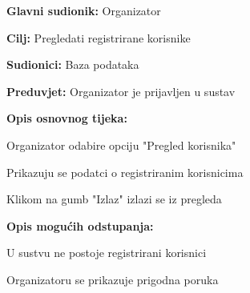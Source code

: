 					\noindent {}
					\begin{packed_item}
					
						\item \textbf{Glavni sudionik: } Organizator
						\item  \textbf{Cilj:} Pregledati registrirane korisnike
						\item  \textbf{Sudionici:} Baza podataka
						\item  \textbf{Preduvjet:} Organizator je prijavljen u sustav
						\item  \textbf{Opis osnovnog tijeka:}
						
						\item[] \begin{packed_enum}
							
							\item Organizator odabire opciju "Pregled korisnika"
							\item Prikazuju se podatci o registriranim korisnicima
							\item Klikom na gumb "Izlaz" izlazi se iz pregleda
						\end{packed_enum}
						
						\item  \textbf{Opis mogućih odstupanja:}
						
						\item[] \begin{packed_item}
							
							\item[2.a] U sustvu ne postoje registrirani korisnici
							\item[] \begin{packed_enum}
								
								\item Organizatoru se prikazuje prigodna poruka
								
							\end{packed_enum}
				
						\end{packed_item}
					\end{packed_item}
				
